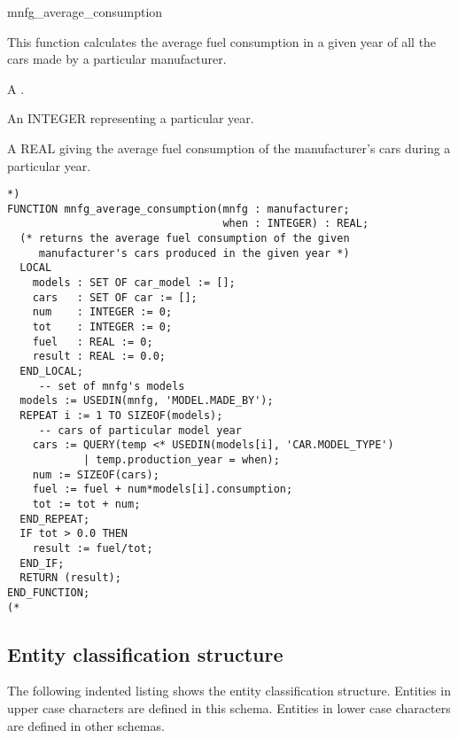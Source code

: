 \documentclass{article}
\begin{document}
\begin{Mnamedesc}{mnfg_average_consumption}
\begin{Mdesctext}
    This function calculates the average fuel consumption in a given year
of all the cars made by a particular manufacturer.
\end{Mdesctext}

\begin{Ipars}

\item[mnfg:] A .

\item[when:] An INTEGER representing a particular year.

\item[RESULT:] A REAL giving the average fuel consumption of the manufacturer's
cars during a particular year.
\end{Ipars}

\begin{Mexp}
\begin{verbatim}
*)
FUNCTION mnfg_average_consumption(mnfg : manufacturer;
                                  when : INTEGER) : REAL;
  (* returns the average fuel consumption of the given 
     manufacturer's cars produced in the given year *) 
  LOCAL
    models : SET OF car_model := [];
    cars   : SET OF car := [];
    num    : INTEGER := 0;
    tot    : INTEGER := 0;
    fuel   : REAL := 0;
    result : REAL := 0.0;
  END_LOCAL;
     -- set of mnfg's models
  models := USEDIN(mnfg, 'MODEL.MADE_BY'); 
  REPEAT i := 1 TO SIZEOF(models);
     -- cars of particular model year
    cars := QUERY(temp <* USEDIN(models[i], 'CAR.MODEL_TYPE')
            | temp.production_year = when);                                 
    num := SIZEOF(cars);
    fuel := fuel + num*models[i].consumption;
    tot := tot + num;
  END_REPEAT;
  IF tot > 0.0 THEN
    result := fuel/tot;
  END_IF;
  RETURN (result);
END_FUNCTION;
(*
\end{verbatim}
\end{Mexp}
\end{Mnamedesc}

\subsection{Entity classification structure}

The following indented listing shows the entity classification structure.
Entities in upper case characters are defined in this schema. Entities in
lower case characters are defined in other schemas.
\end{document}

